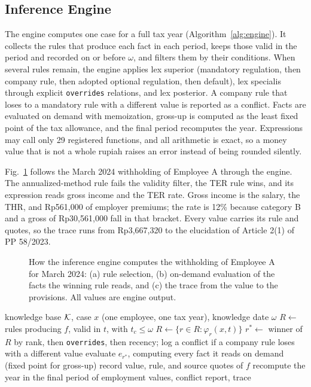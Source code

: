 \subsection{Inference Engine}
\label{sec:engine}
The engine computes one case for a full tax year (Algorithm~\ref{alg:engine}). It collects the rules that produce each fact in each period, keeps those valid in the period and recorded on or before $\omega$, and filters them by their conditions. When several rules remain, the engine applies lex superior (mandatory regulation, then company rule, then adopted optional regulation, then default), lex specialis through explicit \texttt{overrides} relations, and lex posterior. A company rule that loses to a mandatory rule with a different value is reported as a conflict. Facts are evaluated on demand with memoization, gross-up is computed as the least fixed point of the tax allowance, and the final period recomputes the year. Expressions may call only 29 registered functions, and all arithmetic is exact, so a money value that is not a whole rupiah raises an error instead of being rounded silently.

Fig.~\ref{fig:engine} follows the March 2024 withholding of Employee A through the engine. The annualized-method rule fails the validity filter, the TER rule wins, and its expression reads gross income and the TER rate. Gross income is the salary, the THR, and Rp561,000 of employer premiums; the rate is 12\% because category B and a gross of Rp30,561,000 fall in that bracket. Every value carries its rule and quotes, so the trace runs from Rp3,667,320 to the elucidation of Article 2(1) of PP 58/2023.

\begin{figure}[!t]
\centering
\figEngine
\caption{How the inference engine computes the withholding of Employee A for March 2024: (a) rule selection, (b) on-demand evaluation of the facts the winning rule reads, and (c) the trace from the value to the provisions. All values are engine output.}
\label{fig:engine}
\end{figure}

\begin{algorithm}[!t]
\caption{Evaluation of one case}
\label{alg:engine}
\footnotesize
\begin{algorithmic}[1]
\REQUIRE knowledge base $\mathcal{K}$, case $x$ (one employee, one tax year), knowledge date $\omega$
  \STATE $R \gets$ rules producing $f$, valid in $t$, with $t_c \leq \omega$
  \STATE $R \gets \{r \in R : \varphi_r(x, t)\}$
  \STATE $r^* \gets$ winner of $R$ by rank, then \texttt{overrides}, then recency; log a conflict if a company rule loses with a different value
  \STATE evaluate $e_{r^*}$, computing every fact it reads on demand (fixed point for gross-up)
  \STATE record value, rule, and source quotes of $f$
\ENDFOR
\STATE recompute the year in the final period of employment
\RETURN values, conflict report, trace
\end{algorithmic}
\end{algorithm}

